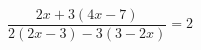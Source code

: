 \begin{ex}[type=equation]
	\begin{condition}
		$\dfrac{2x + 3(4x - 7)}{2(2x - 3)-3(3-2x)} = 2$
	\end{condition}
	\answer{$ \varnothing$}
\end{ex}